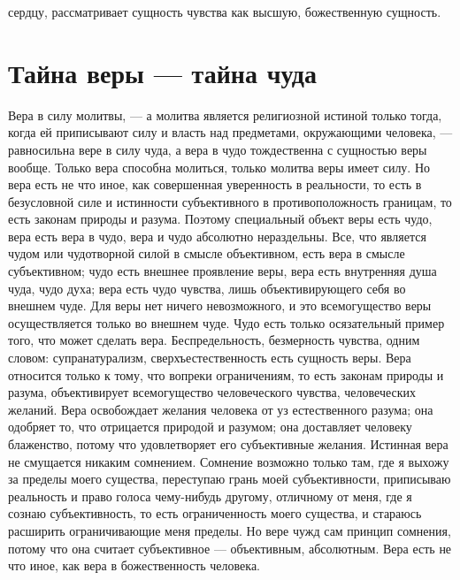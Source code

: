 \documentclass[12pt,oneside]{book}
\begin{document}
сердцу, рассматривает сущность чувства как высшую, божественную сущность.





\chapter{Тайна веры --- тайна чуда}



Вера в силу молитвы, --- а молитва является религиозной истиной только тогда, когда ей приписывают силу и власть над предметами, окружающими человека, --- равносильна вере в силу чуда, а вера в чудо тождественна с сущностью веры вообще. Только вера способна молиться, только молитва веры имеет силу. Но вера есть не что иное, как совершенная уверенность в реальности, то есть в безусловной силе и истинности субъективного в противоположность границам, то есть законам природы и разума. Поэтому специальный объект веры есть чудо, вера есть вера в чудо, вера и чудо абсолютно нераздельны. Все, что является чудом или чудотворной силой в смысле объективном, есть вера в смысле субъективном; чудо есть внешнее проявление веры, вера есть внутренняя душа чуда, чудо духа; вера есть чудо чувства, лишь объективирующего себя во внешнем чуде. Для веры нет ничего невозможного, и это всемогущество веры осуществляется только во внешнем чуде. Чудо есть только осязательный пример того, что может сделать вера. Беспредельность, безмерность чувства, одним словом: супранатурализм, сверхъестественность есть сущность веры. Вера относится только к тому, что вопреки ограничениям, то есть законам природы и разума, объективирует всемогущество человеческого чувства, человеческих желаний. Вера освобождает желания человека от уз естественного разума; она одобряет то, что отрицается природой и разумом; она доставляет человеку блаженство, потому что удовлетворяет его субъективные желания. Истинная вера не смущается никаким сомнением. Сомнение возможно только там, где я выхожу за пределы моего существа, переступаю грань моей субъективности, приписываю реальность и право голоса чему-нибудь другому, отличному от меня, где я сознаю субъективность, то есть ограниченность моего существа, и стараюсь расширить ограничивающие меня пределы. Но вере чужд сам принцип сомнения, потому что она считает субъективное --- объективным, абсолютным. Вера есть не что иное, как вера в божественность человека.
\end{document}
